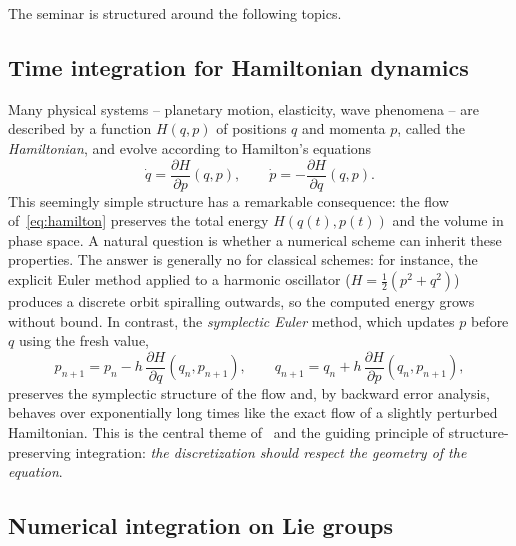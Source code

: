 \documentclass[11pt]{article}
\begin{document}
The seminar is structured around the following topics. %

\subsection{Time integration for Hamiltonian dynamics} %

Many physical systems -- planetary motion, elasticity, wave
phenomena -- are described by a function $H(q,p)$ of positions
$q$ and momenta $p$, called the \emph{Hamiltonian}, and evolve
according to Hamilton's equations
\begin{equation}\label{eq:hamilton}
  \dot q = \frac{\partial H}{\partial p}(q,p),
  \qquad
  \dot p = -\frac{\partial H}{\partial q}(q,p).
\end{equation}
This seemingly simple structure has a remarkable consequence: the
flow of~\eqref{eq:hamilton} preserves the total energy
$H(q(t),p(t))$ and the volume in phase space. A natural question
is whether a numerical scheme can inherit these properties.
The answer is generally no for classical schemes: for instance,
the explicit Euler method applied to a harmonic oscillator
($H=\tfrac12(p^2+q^2)$) produces a discrete orbit spiralling
outwards, so the computed energy grows without bound. In
contrast, the \emph{symplectic Euler} method, which updates $p$
before $q$ using the fresh value,
\begin{equation}\label{eq:symplectic-euler}
  p_{n+1} = p_n - h\,\frac{\partial H}{\partial q}(q_n,p_{n+1}),
  \qquad
  q_{n+1} = q_n + h\,\frac{\partial H}{\partial p}(q_n,p_{n+1}),
\end{equation}
preserves the symplectic structure of the flow and, by backward
error analysis, behaves over exponentially long times like the
exact flow of a slightly perturbed Hamiltonian. This is the
central theme of~\cite{hairer2006} and the guiding principle of
structure-preserving integration: \emph{the discretization
should respect the geometry of the equation}.

\subsection{Numerical integration on Lie groups}
\end{document}
